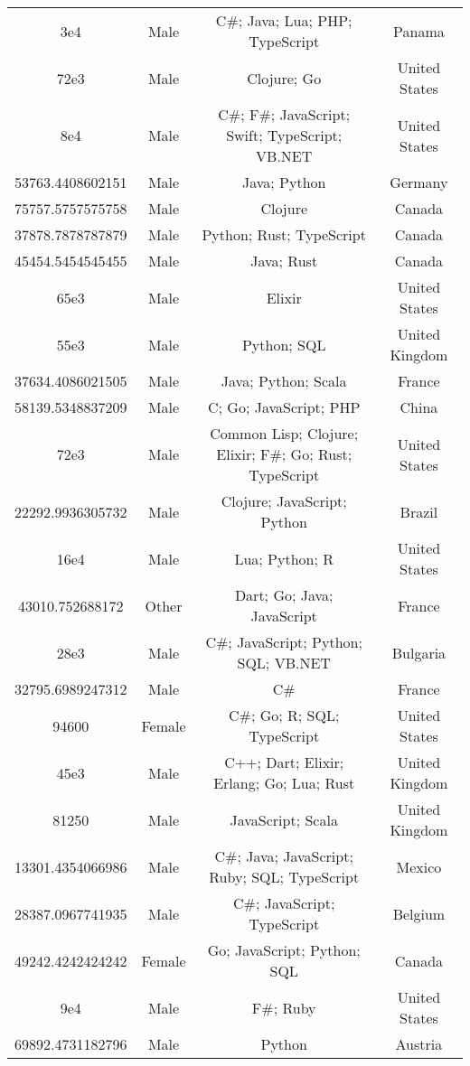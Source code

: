\begin{center}
\begin{tabular}{ |c|c|c|c| }
3e4  &  Male  &  C\#; Java; Lua; PHP; TypeScript  &  Panama  \\ 
72e3  &  Male  &  Clojure; Go  &  United States  \\ 
8e4  &  Male  &  C\#; F\#; JavaScript; Swift; TypeScript; VB.NET  &  United States  \\ 
53763.4408602151  &  Male  &  Java; Python  &  Germany  \\ 
75757.5757575758  &  Male  &  Clojure  &  Canada  \\ 
37878.7878787879  &  Male  &  Python; Rust; TypeScript  &  Canada  \\ 
45454.5454545455  &  Male  &  Java; Rust  &  Canada  \\ 
65e3  &  Male  &  Elixir  &  United States  \\ 
55e3  &  Male  &  Python; SQL  &  United Kingdom  \\ 
37634.4086021505  &  Male  &  Java; Python; Scala  &  France  \\ 
58139.5348837209  &  Male  &  C; Go; JavaScript; PHP  &  China  \\ 
72e3  &  Male  &  Common Lisp; Clojure; Elixir; F\#; Go; Rust; TypeScript  &  United States  \\ 
22292.9936305732  &  Male  &  Clojure; JavaScript; Python  &  Brazil  \\ 
16e4  &  Male  &  Lua; Python; R  &  United States  \\ 
43010.752688172  &  Other  &  Dart; Go; Java; JavaScript  &  France  \\ 
28e3  &  Male  &  C\#; JavaScript; Python; SQL; VB.NET  &  Bulgaria  \\ 
32795.6989247312  &  Male  &  C\#  &  France  \\ 
94600  &  Female  &  C\#; Go; R; SQL; TypeScript  &  United States  \\ 
45e3  &  Male  &  C++; Dart; Elixir; Erlang; Go; Lua; Rust  &  United Kingdom  \\ 
81250  &  Male  &  JavaScript; Scala  &  United Kingdom  \\ 
13301.4354066986  &  Male  &  C\#; Java; JavaScript; Ruby; SQL; TypeScript  &  Mexico  \\ 
28387.0967741935  &  Male  &  C\#; JavaScript; TypeScript  &  Belgium  \\ 
49242.4242424242  &  Female  &  Go; JavaScript; Python; SQL  &  Canada  \\ 
9e4  &  Male  &  F\#; Ruby  &  United States  \\ 
69892.4731182796  &  Male  &  Python  &  Austria  \\ 

\end{tabular}
\end{center}
